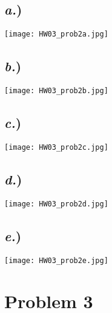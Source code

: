 \documentclass{report}
\begin{document}
\begin{multicols}{2}

\subsection*{\textit{a.})}
\texttt{[image: HW03\_prob2a.jpg]}

\subsection*{\textit{b.})}
\texttt{[image: HW03\_prob2b.jpg]}

\subsection*{\textit{c.})}
\texttt{[image: HW03\_prob2c.jpg]}

\subsection*{\textit{d.})}
\texttt{[image: HW03\_prob2d.jpg]}

\subsection*{\textit{e.})}
\texttt{[image: HW03\_prob2e.jpg]}

\end{multicols}



\newpage
\section*{Problem 3}
\end{document}
